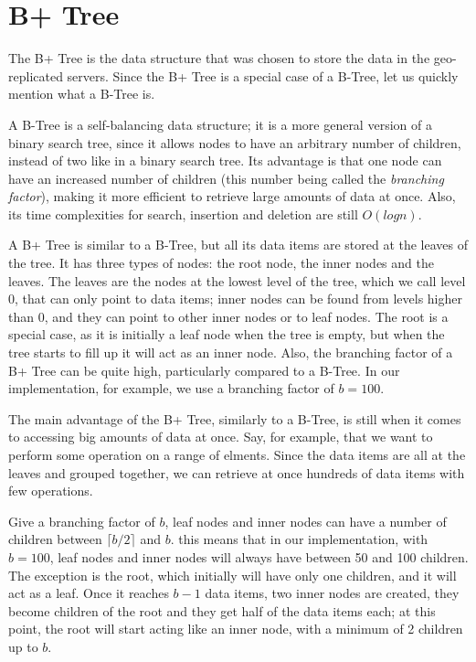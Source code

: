 \section{B+ Tree}\label{sec:b+tree}
The B+ Tree is the data structure that was chosen to store the data in the geo-replicated servers. Since the B+ Tree is a special case of a B-Tree, let us quickly mention what a B-Tree is.

A B-Tree is a self-balancing data structure; it is a more general version of a binary search tree, since it allows nodes to have an arbitrary number of children, instead of two like in a binary search tree. Its advantage is that one node can have an increased number of children (this number being called the \emph{branching factor}), making it more efficient to retrieve large amounts of data at once. Also, its time complexities for search, insertion and deletion are still $O(log n)$.

A B+ Tree is similar to a B-Tree, but all its data items are stored at the leaves of the tree. It has three types of nodes: the root node, the inner nodes and the leaves. The leaves are the nodes at the lowest level of the tree, which we call level 0, that can only point to data items; inner nodes can be found from levels higher than 0, and they can point to other inner nodes or to leaf nodes. The root is a special case, as it is initially a leaf node when the tree is empty, but when the tree starts to fill up it will act as an inner node. Also, the branching factor of a B+ Tree can be quite high, particularly compared to a B-Tree. In our implementation, for example, we use a branching factor of $b=100$.

The main advantage of the B+ Tree, similarly to a B-Tree, is still when it comes to accessing big amounts of data at once. Say, for example, that we want to perform some operation on a range of elments. Since the data items are all at the leaves and grouped together, we can retrieve at once hundreds of data items with few operations.

Give a branching factor of $b$, leaf nodes and inner nodes can have a number of children between $\lceil b/2 \rceil$ and $b$. this means that in our implementation, with $b=100$, leaf nodes and inner nodes will always have between 50 and 100 children. The exception is the root, which initially will have only one children, and it will act as a leaf. Once it reaches $b-1$ data items, two inner nodes are created, they become children of the root and they get half of the data items each; at this point, the root will start acting like an inner node, with a minimum of 2 children up to $b$.

